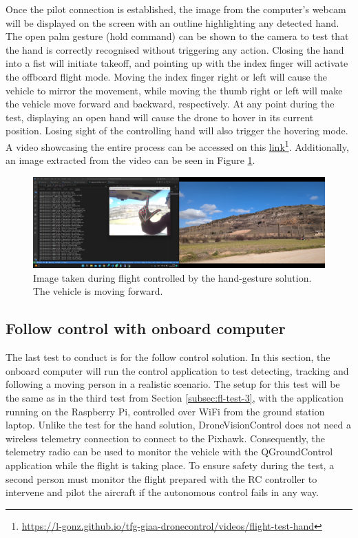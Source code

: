 Once the pilot connection is established, the image from the computer's webcam will be displayed on the screen with an outline highlighting any detected hand. The open palm gesture (hold command) can be shown to the camera to test that the hand is correctly recognised without triggering any action. Closing the hand into a fist will initiate takeoff, and pointing up with the index finger will activate the offboard flight mode. Moving the index finger right or left will cause the vehicle to mirror the movement, while moving the thumb right or left will make the vehicle move forward and backward, respectively. At any point during the test, displaying an open hand will cause the drone to hover in its current position. Losing sight of the controlling hand will also trigger the hovering mode. A video showcasing the entire process can be accessed on this \href{https://l-gonz.github.io/tfg-giaa-dronecontrol/videos/flight-test-hand}{link}\footnote{\url{https://l-gonz.github.io/tfg-giaa-dronecontrol/videos/flight-test-hand}}. Additionally, an image extracted from the video can be seen in Figure \ref{fig:flight-test-hand}.

\begin{figure}[H]
  \centering
  \includegraphics[width=\textwidth, keepaspectratio]{img/video-field-test-hand.png}
  \caption{Image taken during flight controlled by the hand-gesture solution. The vehicle is moving forward.}
  \label{fig:flight-test-hand}
\end{figure}


\subsection{Follow control with onboard computer}
\label{subsec:fl-test-5}

The last test to conduct is for the follow control solution. In this section, the onboard computer will run the control application to test detecting, tracking and following a moving person in a realistic scenario. The setup for this test will be the same as in the third test from Section \ref{subsec:fl-test-3}, with the application running on the Raspberry Pi, controlled over WiFi from the ground station laptop. Unlike the test for the hand solution, DroneVisionControl does not need a wireless telemetry connection to connect to the Pixhawk. Consequently, the telemetry radio can be used to monitor the vehicle with the QGroundControl application while the flight is taking place. To ensure safety during the test, a second person must monitor the flight prepared with the RC controller to intervene and pilot the aircraft if the autonomous control fails in any way.


